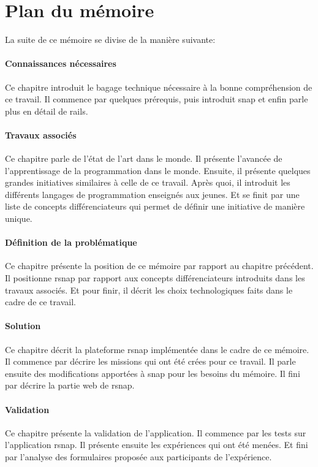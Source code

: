 ﻿\section{Plan du mémoire}
La suite de ce mémoire se divise de la manière suivante:

\paragraph{Connaissances nécessaires}
Ce chapitre introduit le bagage technique nécessaire à la bonne compréhension de ce travail. Il commence par quelques prérequis, puis introduit \gls{snap} et enfin parle plus en détail de \gls{rails}.

\paragraph{Travaux associés}
Ce chapitre parle de l'état de l'art dans le monde. Il présente l'avancée de l'apprentissage de la programmation dans le monde. Ensuite, il présente quelques grandes initiatives similaires à celle de ce travail. Après quoi, il introduit les différents langages de programmation enseignés aux jeunes. Et se finit par une liste de concepts différenciateurs qui permet de définir une initiative de manière unique.

\paragraph{Définition de la problématique}
Ce chapitre présente la position de ce mémoire par rapport au chapitre précédent. Il positionne \gls{rsnap} par rapport aux concepts différenciateurs introduits dans les travaux associés. Et pour finir, il décrit les choix technologiques faits dans le cadre de ce travail.

\paragraph{Solution}
Ce chapitre décrit la plateforme \gls{rsnap} implémentée dans le cadre de ce mémoire.
Il commence par décrire les \glspl{mission} qui ont été crées pour ce travail. Il parle ensuite des modifications apportées à \gls{snap} pour les besoins du mémoire. Il fini par décrire la partie web de \gls{rsnap}.

\paragraph{Validation}
Ce chapitre présente la validation de l'application. Il commence par les tests sur l'application \gls{rsnap}. Il présente ensuite les expériences qui ont été menées. Et fini par l'analyse des formulaires proposée aux participants de l'expérience.


